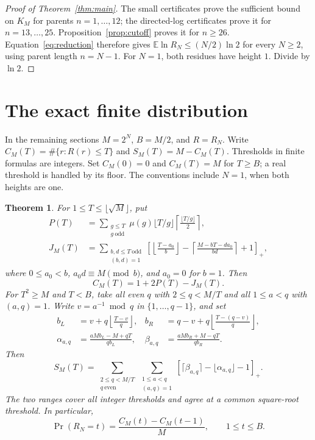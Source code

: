 \documentclass[11pt,a4paper]{article}
\numberwithin{equation}{section}
\newtheorem{theorem}{Theorem}[section]
\theoremstyle{remark}
\newcommand{\E}{\mathbb E}
\newcommand{\pos}[1]{\left[#1\right]_+}
\newcommand{\odd}{\mathrm{odd}}
\begin{document}
\begin{proof}[Proof of Theorem~\ref{thm:main}]
The small certificates prove the sufficient bound on $K_M$ for
parents $n=1,\ldots,12$; the directed-log certificates prove it for
$n=13,\ldots,25$.
Proposition~\ref{prop:cutoff} proves it for $n\ge26$.
Equation~\eqref{eq:reduction} therefore gives
$\E\ln R_N\le(N/2)\ln2$ for every $N\ge2$, using parent length $n=N-1$.
For $N=1$, both residues have height $1$. Divide by $\ln2$.
\end{proof}

\section{The exact finite distribution}\label{sec:law}
In the remaining sections $M=2^N$, $B=M/2$, and $R=R_N$.
Write $C_M(T)=\#\{r:R(r)\le T\}$ and $S_M(T)=M-C_M(T)$.
Thresholds in finite formulas are integers. Set $C_M(0)=0$ and
$C_M(T)=M$ for $T\ge B$; a real threshold is handled by its floor.
The conventions include $N=1$, when both heights are one.

\begin{theorem}\label{thm:finite}
For $1\le T\le\lfloor\sqrt M\rfloor$, put
\begin{align}
P(T)&=\sum_{\substack{g\le T\\g\ \odd}}\mu(g)
\lfloor T/g\rfloor\left\lceil\frac{\lfloor T/g\rfloor}{2}\right\rceil,
\label{eq:positivecount}\\
J_M(T)&=\sum_{\substack{b,d\le T\ \odd\\(b,d)=1}}
\pos{\left\lfloor\frac{T-a_0}{b}\right\rfloor
-\left\lceil\frac{M-bT-da_0}{bd}\right\rceil+1},\label{eq:collision}
\end{align}
where $0\le a_0<b$, $a_0d\equiv M\pmod b$, and $a_0=0$ for $b=1$.
Then
\begin{equation}\label{eq:centralCDF}
C_M(T)=1+2P(T)-J_M(T).
\end{equation}
For $T^2\ge M$ and $T<B$, take all even $q$ with $2\le q<M/T$
and all $1\le a<q$ with $(a,q)=1$. Write $v=a^{-1}\bmod q$ in
$\{1,\ldots,q-1\}$, and set
\begin{align}
b_L&=v+q\left\lfloor\frac{T-v}{q}\right\rfloor,&
b_R&=q-v+q\left\lfloor\frac{T-(q-v)}q\right\rfloor,\label{eq:neighbors}\\
\alpha_{a,q}&=\frac{aMb_L-M+qT}{qb_L},&
\beta_{a,q}&=\frac{aMb_R+M-qT}{qb_R}.\label{eq:holeends}
\end{align}
Then
\begin{equation}\label{eq:highCDF}
S_M(T)=\sum_{\substack{2\le q<M/T\\q\ \mathrm{even}}}
\sum_{\substack{1\le a<q\\(a,q)=1}}
\pos{\lceil\beta_{a,q}\rceil-\lfloor\alpha_{a,q}\rfloor-1}.
\end{equation}
The two ranges cover all integer thresholds and agree at a common
square-root threshold. In particular,
\begin{equation}\label{eq:mass}
\Pr(R_N=t)=\frac{C_M(t)-C_M(t-1)}M,\qquad 1\le t\le B.
\end{equation}
\end{theorem}
\end{document}
